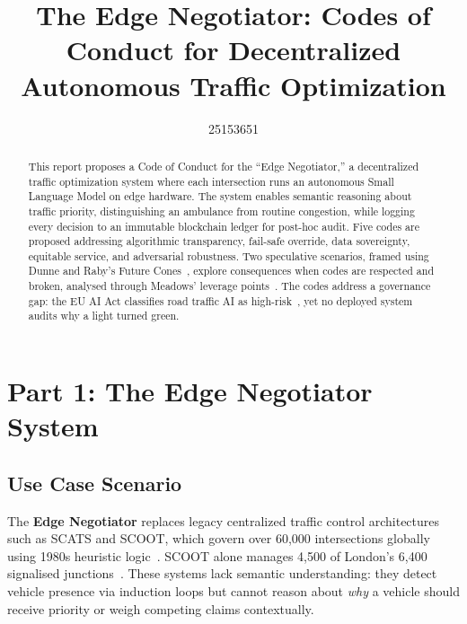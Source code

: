 \documentclass[sigconf,nonacm]{acmart}
\begin{document}
\title{The Edge Negotiator: Codes of Conduct for Decentralized Autonomous Traffic Optimization}

\author{25153651}

\begin{abstract}
This report proposes a Code of Conduct for the ``Edge Negotiator,'' a decentralized traffic optimization system where each intersection runs an autonomous Small Language Model on edge hardware. The system enables semantic reasoning about traffic priority, distinguishing an ambulance from routine congestion, while logging every decision to an immutable blockchain ledger for post-hoc audit. Five codes are proposed addressing algorithmic transparency, fail-safe override, data sovereignty, equitable service, and adversarial robustness. Two speculative scenarios, framed using Dunne and Raby's Future Cones~\cite{dunne2013}, explore consequences when codes are respected and broken, analysed through Meadows' leverage points~\cite{meadows1999}. The codes address a governance gap: the EU AI Act classifies road traffic AI as high-risk~\cite{euaiact}, yet no deployed system audits why a light turned green.
\end{abstract}


\maketitle

\section{Part 1: The Edge Negotiator System}

\subsection{Use Case Scenario}

The \textbf{Edge Negotiator} replaces legacy centralized traffic control architectures such as SCATS and SCOOT, which govern over 60,000 intersections globally using 1980s heuristic logic~\cite{fairscosca}. SCOOT alone manages 4,500 of London's 6,400 signalised junctions~\cite{tfl2024}. These systems lack semantic understanding: they detect vehicle presence via induction loops but cannot reason about \textit{why} a vehicle should receive priority or weigh competing claims contextually.
\end{document}
